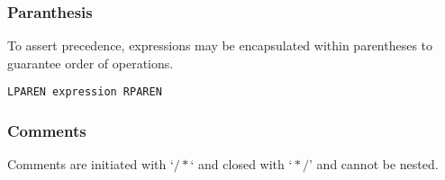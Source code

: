 \documentclass[./LRM_main.tex]{subfiles}
\begin{document}
\subsubsection{Paranthesis }
To assert precedence, expressions may be encapsulated within parentheses to guarantee order of operations.
\begin{lstlisting}
LPAREN expression RPAREN
\end{lstlisting}

\subsubsection{Comments }
Comments are initiated with $‘/* ‘$ and closed with $‘*/’$ and cannot be nested.
\end{document}
